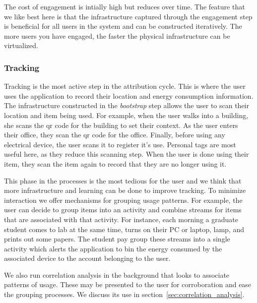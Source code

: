 The cost of engagement is intially high but reduces over time.  The feature that we like best here is that the infrastructure captured through the engagement
step is beneficial for all users in the system and can be constructed iteratively.  The more users you have engaged, the faster the physical infrastructure
can be virtualized.

\subsubsection{Tracking}

Tracking is the most active step in the attribution cycle.  This is where the user uses the application to record their location and energy consumption
information.  The infrastructure constructed in the \emph{bootstrap} step allows the user to scan their location and item being used.  For example, when the user walks into a building, she scans the qr code for the building to set their context.  As the user enters their office, they scan the qr code for the office.  Finally, 
before using any electrical device, the user scans it to register it's use.  Personal tags are most useful here, as they reduce this scanning step.
When the user is done using their item, they scan the item again to record that they are no longer using it.

This phase in the processes is the most tedious for the user and we think that more infrastructure and learning can be done to improve tracking.
To minimize interaction we offer mechanisms for grouping usage patterns.  For example, the user can decide to group items into an activity and 
combine streams for items that are associated with that activity.  For instance, each morning a graduate student comes to lab at the same time, 
turns on their PC or laptop, lamp, and prints out some papers.  The student pay group these streams into a single activity which alerts the application
to bin the energy consumed by the associated device to the account belonging to the user.

We also run correlation analysis in the background that looks to associate patterns of usage.  These may be presented to the user for corroboration
and ease the grouping processes.  We discuss its use in section~\ref{sec:correlation_analysis}.


